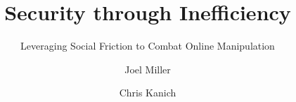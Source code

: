 \documentclass[sigconf,authordraft]{acmart}
\begin{document}
\title{Security through Inefficiency} \subtitle{Leveraging Social Friction to Combat Online Manipulation}

%

\author{Joel Miller}

\author{Chris Kanich}











\end{document}
